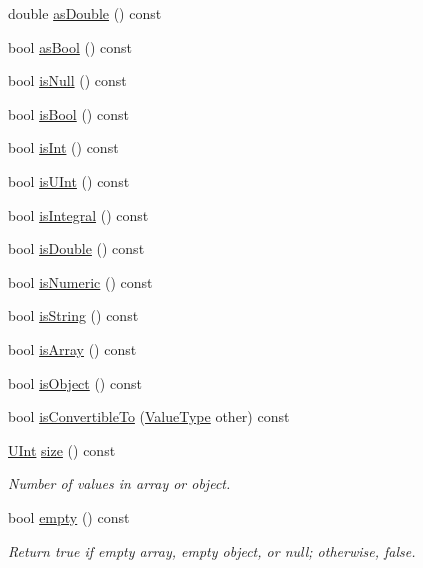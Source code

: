 \begin{DoxyCompactItemize}
\item 
double \hyperlink{classJson_1_1Value_a33434ed1c0217a34d04c95fa5342fd37}{as\-Double} () const 
\item 
bool \hyperlink{classJson_1_1Value_a7402c797285c020566c3db5f8ae4e940}{as\-Bool} () const 
\item 
bool \hyperlink{classJson_1_1Value_aeb9ad8b1bb91bdd72203dc884b3f4362}{is\-Null} () const 
\item 
bool \hyperlink{classJson_1_1Value_a3c3716cc7a0216cb1b654bb8f61c8d13}{is\-Bool} () const 
\item 
bool \hyperlink{classJson_1_1Value_ab0df4746d6787d2ce1db1a156c118f14}{is\-Int} () const 
\item 
bool \hyperlink{classJson_1_1Value_ae814ca1796fe2d43ac09898b70213989}{is\-U\-Int} () const 
\item 
bool \hyperlink{classJson_1_1Value_aec4f74ef7b776b1d9c8a10fc3bb4add5}{is\-Integral} () const 
\item 
bool \hyperlink{classJson_1_1Value_a0ea567fa51fc808851698bef59b43626}{is\-Double} () const 
\item 
bool \hyperlink{classJson_1_1Value_a8ce848900e2e8fa23a41fcc2c1409fab}{is\-Numeric} () const 
\item 
bool \hyperlink{classJson_1_1Value_a06c01d7c1e8151a5844b595ab00f46c7}{is\-String} () const 
\item 
bool \hyperlink{classJson_1_1Value_ac8c898f93543e55b67418f94bced20af}{is\-Array} () const 
\item 
bool \hyperlink{classJson_1_1Value_a80cffaa0402b80317c0437216bbb6d92}{is\-Object} () const 
\item 
bool \hyperlink{classJson_1_1Value_a7ec153803631a27abf58cba2bb1af70c}{is\-Convertible\-To} (\hyperlink{namespaceJson_a7d654b75c16a57007925868e38212b4e}{Value\-Type} other) const 
\item 
\hyperlink{classJson_1_1Value_a0933d59b45793ae4aade1757c322a98d}{U\-Int} \hyperlink{classJson_1_1Value_a69d4f979237e19aabef12de56c18c38f}{size} () const 
\begin{DoxyCompactList}\small\item\em Number of values in array or object. \end{DoxyCompactList}\item 
bool \hyperlink{classJson_1_1Value_a99c42d3ff8495dad1e91b43e66553c36}{empty} () const 
\begin{DoxyCompactList}\small\item\em Return true if empty array, empty object, or null; otherwise, false. \end{DoxyCompactList}\item 

\end{DoxyCompactItemize}
